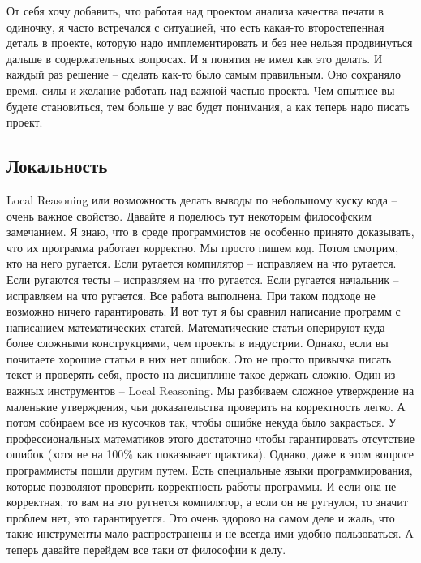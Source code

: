 От себя хочу добавить, что работая над проектом анализа качества печати в одиночку, я часто встречался с ситуацией, что есть какая-то второстепенная деталь в проекте, которую надо имплементировать и без нее нельзя продвинуться дальше в содержательных вопросах.
И я понятия не имел как это делать.
И каждый раз решение -- сделать как-то было самым правильным.
Оно сохраняло время, силы и желание работать над важной частью проекта.
Чем опытнее вы будете становиться, тем больше у вас будет понимания, а как теперь надо писать проект.


\subsection{Локальность}
\label{section::Locality}

Local Reasoning или возможность делать выводы по небольшому куску кода -- очень важное свойство.
Давайте я поделюсь тут некоторым философским замечанием.
Я знаю, что в среде программистов не особенно принято доказывать, что их программа работает корректно.
Мы просто пишем код.
Потом смотрим, кто на него ругается.
Если ругается компилятор -- исправляем на что ругается.
Если ругаются тесты -- исправляем на что ругается.
Если ругается начальник -- исправляем на что ругается.
Все работа выполнена.
При таком подходе не возможно ничего гарантировать.
И вот тут я бы сравнил написание программ с написанием математических статей.
Математические статьи оперируют куда более сложными конструкциями, чем проекты в индустрии.
Однако, если вы почитаете хорошие статьи в них нет ошибок.
Это не просто привычка писать текст и проверять себя, просто на дисциплине такое держать сложно.
Один из важных инструментов -- Local Reasoning.
Мы разбиваем сложное утверждение на маленькие утверждения, чьи доказательства проверить на корректность легко.
А потом собираем все из кусочков так, чтобы ошибке некуда было закрасться.
У профессиональных математиков этого достаточно чтобы гарантировать отсутствие ошибок (хотя не на 100\% как показывает практика).
Однако, даже в этом вопросе программисты пошли другим путем.
Есть специальные языки программирования, которые позволяют проверить корректность работы программы.
И если она не корректная, то вам на это ругнется компилятор, а если он не ругнулся, то значит проблем нет, это гарантируется.
Это очень здорово на самом деле и жаль, что такие инструменты мало распространены и не всегда ими удобно пользоваться.
А теперь давайте перейдем все таки от философии к делу.


